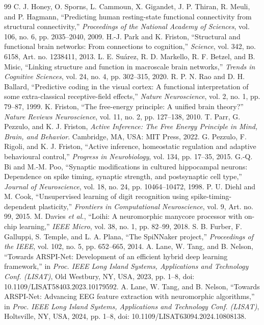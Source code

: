 \documentclass[journal]{IEEEtran}
\begin{document}
\begin{thebibliography}{99}
 C. J. Honey, O. Sporns, L. Cammoun, X. Gigandet, J. P. Thiran, R. Meuli, and P. Hagmann, ``Predicting human resting-state functional connectivity from structural connectivity,'' \emph{Proceedings of the National Academy of Sciences}, vol. 106, no. 6, pp. 2035--2040, 2009.
 H.-J. Park and K. Friston, ``Structural and functional brain networks: From connections to cognition,'' \emph{Science}, vol. 342, no. 6158, Art. no. 1238411, 2013.
 L. E. Su\'arez, R. D. Markello, R. F. Betzel, and B. Misic, ``Linking structure and function in macroscale brain networks,'' \emph{Trends in Cognitive Sciences}, vol. 24, no. 4, pp. 302--315, 2020.
 R. P. N. Rao and D. H. Ballard, ``Predictive coding in the visual cortex: A functional interpretation of some extra-classical receptive-field effects,'' \emph{Nature Neuroscience}, vol. 2, no. 1, pp. 79--87, 1999.
 K. Friston, ``The free-energy principle: A unified brain theory?'' \emph{Nature Reviews Neuroscience}, vol. 11, no. 2, pp. 127--138, 2010.
 T. Parr, G. Pezzulo, and K. J. Friston, \emph{Active Inference: The Free Energy Principle in Mind, Brain, and Behavior}. Cambridge, MA, USA: MIT Press, 2022.
 G. Pezzulo, F. Rigoli, and K. J. Friston, ``Active inference, homeostatic regulation and adaptive behavioural control,'' \emph{Progress in Neurobiology}, vol. 134, pp. 17--35, 2015.
 G.-Q. Bi and M.-M. Poo, ``Synaptic modifications in cultured hippocampal neurons: Dependence on spike timing, synaptic strength, and postsynaptic cell type,'' \emph{Journal of Neuroscience}, vol. 18, no. 24, pp. 10464--10472, 1998.
 P. U. Diehl and M. Cook, ``Unsupervised learning of digit recognition using spike-timing-dependent plasticity,'' \emph{Frontiers in Computational Neuroscience}, vol. 9, Art. no. 99, 2015.
 M. Davies \emph{et al.}, ``Loihi: A neuromorphic manycore processor with on-chip learning,'' \emph{IEEE Micro}, vol. 38, no. 1, pp. 82--99, 2018.
 S. B. Furber, F. Galluppi, S. Temple, and L. A. Plana, ``The SpiNNaker project,'' \emph{Proceedings of the IEEE}, vol. 102, no. 5, pp. 652--665, 2014.
 A. Lane, W. Tang, and B. Nelson, ``Towards ARSPI-Net: Development of an efficient hybrid deep learning framework,'' in \emph{Proc. IEEE Long Island Systems, Applications and Technology Conf. (LISAT)}, Old Westbury, NY, USA, 2023, pp. 1--8, doi: 10.1109/LISAT58403.2023.10179592.
 A. Lane, W. Tang, and B. Nelson, ``Towards ARSPI-Net: Advancing EEG feature extraction with neuromorphic algorithms,'' in \emph{Proc. IEEE Long Island Systems, Applications and Technology Conf. (LISAT)}, Holtsville, NY, USA, 2024, pp. 1--8, doi: 10.1109/LISAT63094.2024.10808138.
\end{thebibliography}
\end{document}
